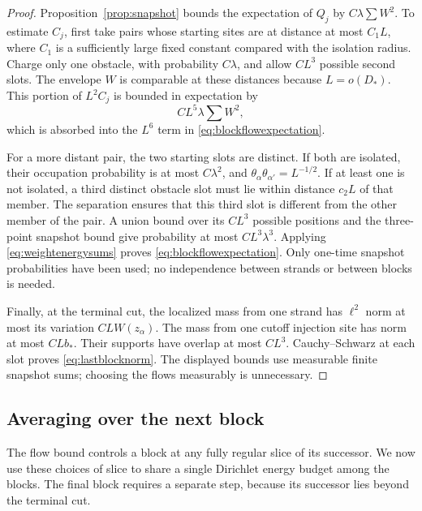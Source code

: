 \begin{proof}
Proposition~\ref{prop:snapshot} bounds the expectation of \(Q_j\) by
\(C\lambda\sum W^2\).  To estimate \(C_j\), first take pairs
whose starting sites are at distance at most \(C_1L\), where
\(C_1\) is a sufficiently large fixed constant compared with the
isolation radius.  Charge only one obstacle, with probability
\(C\lambda\), and allow \(CL^3\) possible second slots.
The envelope \(W\) is comparable at these distances because
\(L=o(D_*)\).  This portion of \(L^2C_j\) is bounded in
expectation by
\[
 CL^5\lambda\sum W^2,
\]
which is absorbed into the \(L^6\) term in
\eqref{eq:blockflowexpectation}.

For a more distant pair, the two starting slots are distinct.  If
both are isolated, their occupation probability is at most
\(C\lambda^2\), and \(\theta_\alpha\theta_{\alpha'}=L^{-1/2}\).
If at least one is not isolated, a third distinct obstacle slot
must lie within distance \(c_2L\) of that member.  The separation
ensures that this third slot is different from the other member of
the pair.  A union bound over its \(CL^3\) possible positions and
the three-point snapshot bound give probability at most
\(CL^3\lambda^3\).  Applying \eqref{eq:weightenergysums} proves
\eqref{eq:blockflowexpectation}.  Only one-time snapshot probabilities
have been used; no independence between strands or between blocks
is needed.

Finally, at the terminal cut, the localized mass from one strand
has \(\ell^2\) norm at most its variation \(CLW(z_\alpha)\).
The mass from one cutoff injection site has norm at most \(CLb_*\).
Their supports have overlap at most \(CL^3\).  Cauchy--Schwarz
at each slot proves \eqref{eq:lastblocknorm}.
The displayed bounds use measurable finite snapshot sums; choosing
the flows measurably is unnecessary.
\end{proof}

\subsection{Averaging over the next block}

The flow bound controls a block at any fully regular slice of its
successor.  We now use these choices of slice to share a single
Dirichlet energy budget among the blocks.  The final block requires
a separate step, because its successor lies beyond the terminal cut.

